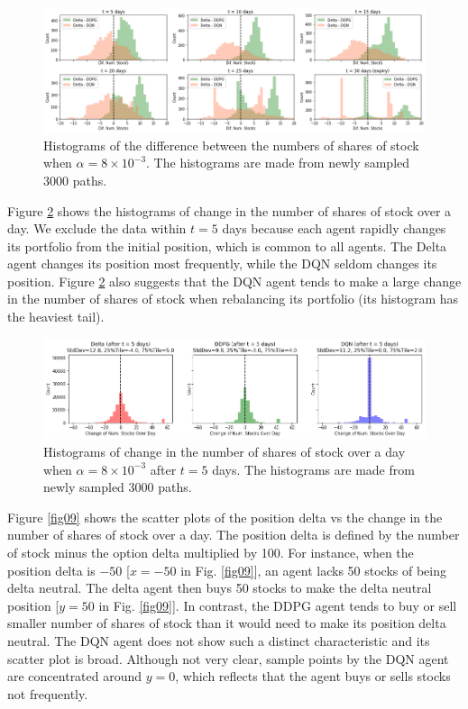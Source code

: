 \documentclass[11pt]{article}
\begin{document}
\begin{figure}[tb]
	\begin{center}
		\includegraphics[width=15cm]{../fig/fig07.png}
		\caption{Histograms of the difference between the numbers of shares of stock when $\alpha = 8 \times 10^{-3}$. The histograms are made from newly sampled 3000 paths.}
		\label{fig07}
	\end{center}
\end{figure}

Figure \ref{fig08} shows the histograms of change in the number of shares of stock over a day. We exclude the data within $t = 5$ days because each agent rapidly changes its portfolio from the initial position, which is common to all agents. The Delta agent changes its position most frequently, while the DQN seldom changes its position. Figure \ref{fig08} also suggests that the DQN agent tends to make a large change in the number of shares of stock when rebalancing its portfolio (its histogram has the heaviest tail).

\begin{figure}[htb]
	\begin{center}
		\includegraphics[width=15cm]{../fig/fig08.png}
		\caption{Histograms of change in the number of shares of stock over a day when $\alpha = 8 \times 10^{-3}$ after $t = 5$ days. The histograms are made from newly sampled 3000 paths.}
		\label{fig08}
	\end{center}
\end{figure}

Figure \ref{fig09} shows the scatter plots of the position delta vs the change in the number of shares of stock over a day. The position delta is defined by the number of stock minus the option delta multiplied by 100. For instance, when the position delta is $-50$ [$x = -50$ in Fig. \ref{fig09}], an agent lacks 50 stocks of being delta neutral. The delta agent then buys 50 stocks to make the delta neutral position [$y = 50$ in Fig. \ref{fig09}]. In contrast, the DDPG agent tends to buy or sell smaller number of shares of stock than it would need to make its position delta neutral. The DQN agent does not show such a distinct characteristic and its scatter plot is broad. Although not very clear, sample points by the DQN agent are concentrated around $y=0$, which reflects that the agent buys or sells stocks not frequently.
\end{document}
